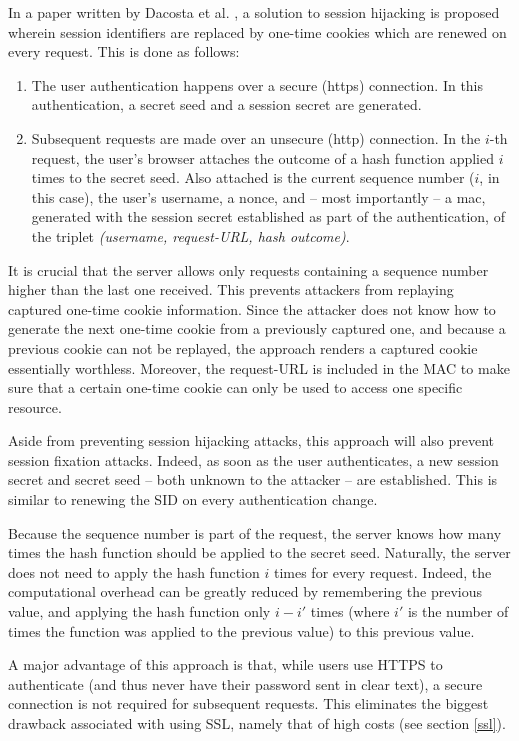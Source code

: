 In a paper written by Dacosta et al. \cite{Dacosta2011}, a solution to session hijacking is proposed wherein session identifiers are replaced by one-time cookies which are renewed on every request. This is done as follows:
\begin{enumerate}
	\item The user authentication happens over a secure (\gls{https}) connection. In this authentication, a secret seed and a session secret are generated.
	\item Subsequent requests are made over an unsecure (\gls{http}) connection. In the $i$-th request, the user's browser attaches the outcome of a hash function  applied $i$ times to the secret seed. Also attached is the current sequence number ($i$, in this case), the user's username, a nonce, and -- most importantly -- a \gls{mac}, generated with the session secret established as part of the authentication, of the triplet \emph{(username, request-URL, hash outcome)}.
\end{enumerate}
It is crucial that the server allows only requests containing a sequence number higher than the last one received. This prevents attackers from replaying captured one-time cookie information. Since the attacker does not know how to generate the next one-time cookie from a previously captured one, and because a previous cookie can not be replayed, the approach renders a captured cookie essentially worthless. Moreover, the request-URL is included in the MAC to make sure that a certain one-time cookie can only be used to access one specific resource.

Aside from preventing session hijacking attacks, this approach will also prevent session fixation attacks. Indeed, as soon as the user authenticates, a new session secret and secret seed -- both unknown to the attacker -- are established. This is similar to renewing the SID on every authentication change.

Because the sequence number is part of the request, the server knows how many times the hash function should be applied to the secret seed. Naturally, the server does not need to apply the hash function $i$ times for every request. Indeed, the computational overhead can be greatly reduced by remembering the previous value, and applying the hash function only $i - i'$ times (where $i'$ is the number of times the function was applied to the previous value) to this previous value.

A major advantage of this approach is that, while users use HTTPS to authenticate (and thus never have their password sent in clear text), a secure connection is not required for subsequent requests. This eliminates the biggest drawback associated with using SSL, namely that of high costs (see section \ref{ssl}).

